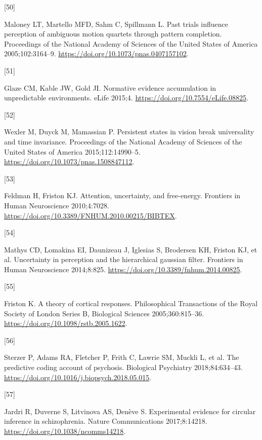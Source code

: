 \documentclass[
]{article}
\newlength{\cslhangindent}
\newlength{\csllabelwidth}
\newlength{\cslentryspacingunit} %
\newenvironment{CSLReferences}[2] %
 {%
  \setlength{\parindent}{0pt}
  \ifodd #1
  \let\oldpar\par
  \def\par{\hangindent=\cslhangindent\oldpar}
  \fi
  \setlength{\parskip}{#2\cslentryspacingunit}
 }%
 {}
\newcommand{\CSLLeftMargin}[1]{\parbox[t]{\csllabelwidth}{#1}}
\newcommand{\CSLRightInline}[1]{\parbox[t]{\linewidth - \csllabelwidth}{#1}\break}
\begin{document}
\begin{CSLReferences}{0}{0}
\leavevmode{}%
\CSLLeftMargin{{[}50{]} }%
\CSLRightInline{Maloney LT, Martello MFD, Sahm C, Spillmann L. Past
trials influence perception of ambiguous motion quartets through pattern
completion. Proceedings of the National Academy of Sciences of the
United States of America 2005;102:3164--9.
\url{https://doi.org/10.1073/pnas.0407157102}.}

\leavevmode{}%
\CSLLeftMargin{{[}51{]} }%
\CSLRightInline{Glaze CM, Kable JW, Gold JI. Normative evidence
accumulation in unpredictable environments. eLife 2015;4.
\url{https://doi.org/10.7554/eLife.08825}.}

\leavevmode{}%
\CSLLeftMargin{{[}52{]} }%
\CSLRightInline{Wexler M, Duyck M, Mamassian P. Persistent states in
vision break universality and time invariance. Proceedings of the
National Academy of Sciences of the United States of America
2015;112:14990--5. \url{https://doi.org/10.1073/pnas.1508847112}.}

\leavevmode{}%
\CSLLeftMargin{{[}53{]} }%
\CSLRightInline{Feldman H, Friston KJ. Attention, uncertainty, and
free-energy. Frontiers in Human Neuroscience 2010;4:7028.
\url{https://doi.org/10.3389/FNHUM.2010.00215/BIBTEX}.}

\leavevmode{}%
\CSLLeftMargin{{[}54{]} }%
\CSLRightInline{Mathys CD, Lomakina EI, Daunizeau J, Iglesias S,
Brodersen KH, Friston KJ, et al. Uncertainty in perception and the
hierarchical gaussian filter. Frontiers in Human Neuroscience
2014;8:825. \url{https://doi.org/10.3389/fnhum.2014.00825}.}

\leavevmode{}%
\CSLLeftMargin{{[}55{]} }%
\CSLRightInline{Friston K. A theory of cortical responses. Philosophical
Transactions of the Royal Society of London Series B, Biological
Sciences 2005;360:815--36.
\url{https://doi.org/10.1098/rstb.2005.1622}.}

\leavevmode{}%
\CSLLeftMargin{{[}56{]} }%
\CSLRightInline{Sterzer P, Adams RA, Fletcher P, Frith C, Lawrie SM,
Muckli L, et al. The predictive coding account of psychosis. Biological
Psychiatry 2018;84:634--43.
\url{https://doi.org/10.1016/j.biopsych.2018.05.015}.}

\leavevmode{}%
\CSLLeftMargin{{[}57{]} }%
\CSLRightInline{Jardri R, Duverne S, Litvinova AS, Denève S.
Experimental evidence for circular inference in schizophrenia. Nature
Communications 2017;8:14218. \url{https://doi.org/10.1038/ncomms14218}.}


\end{CSLReferences}
\end{document}

